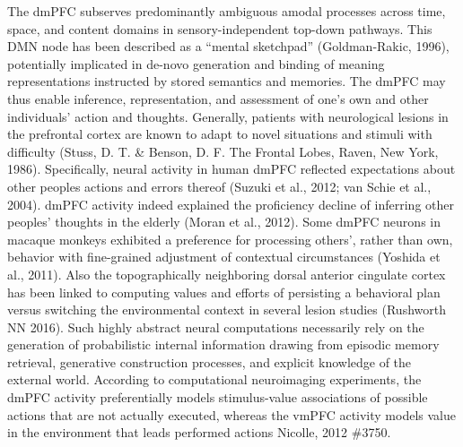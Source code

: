 \documentclass{article} %
\begin{document}
The dmPFC subserves predominantly ambiguous amodal processes
across time, space, and content domains in
sensory-independent top-down pathways.
This DMN node has been described as a “mental sketchpad” (Goldman-Rakic, 1996),
potentially implicated in de-novo generation and binding
of meaning representations instructed by stored semantics and memories.
%
The dmPFC may thus enable inference, representation, and assessment
of one's own and other individuals' action and thoughts.
Generally,
patients with neurological lesions in the prefrontal cortex
are known to adapt to novel situations and stimuli with difficulty
(Stuss, D. T. \& Benson, D. F. The Frontal Lobes, Raven, New York, 1986).
Specifically, neural activity in human dmPFC
reflected expectations about other peoples actions and errors thereof
(Suzuki et al., 2012; van Schie et al., 2004).
dmPFC activity indeed explained the proficiency decline
of inferring other peoples' thoughts in the elderly (Moran et al., 2012).
Some dmPFC neurons in macaque monkeys exhibited a preference
for processing others', rather than own, behavior
with fine-grained adjustment of contextual circumstances (Yoshida et al., 2011).
Also the topographically neighboring dorsal anterior cingulate cortex
has been linked to computing values and efforts of
persisting a behavioral plan versus switching the
environmental context in several lesion studies (Rushworth NN 2016).
%
Such highly abstract neural computations necessarily rely on the
generation of probabilistic internal information drawing from
episodic memory retrieval, generative construction processes,
and explicit knowledge of the external world.
%
According to computational neuroimaging experiments,
the dmPFC activity preferentially models stimulus-value associations of
possible actions that are not actually executed,
whereas the vmPFC activity models value in the environment that leads performed actions
{Nicolle, 2012 \#3750}.
\end{document}
